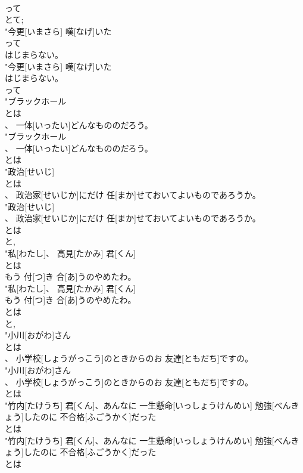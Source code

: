 \documentclass[8pt]{extreport}
\begin{document}
\begin{CJK}{UTF8}{min}
\\	って
\\	とて; 
\\	"今更[いまさら] 嘆[なげ]いた
\\	って
\\	はじまらない。
\\	"今更[いまさら] 嘆[なげ]いた
\\	はじまらない。
\\	って
\\	"ブラックホール
\\	とは
\\	、 一体[いったい]どんなもののだろう。
\\	"ブラックホール
\\	、 一体[いったい]どんなもののだろう。
\\	とは
\\	"政治[せいじ]
\\	とは
\\	、 政治家[せいじか]にだけ 任[まか]せておいてよいものであろうか。
\\	"政治[せいじ]
\\	、 政治家[せいじか]にだけ 任[まか]せておいてよいものであろうか。
\\	とは
\\	と, 
\\	"私[わたし]、 高見[たかみ] 君[くん]
\\	とは
\\	もう 付[つ]き 合[あ]うのやめたわ。
\\	"私[わたし]、 高見[たかみ] 君[くん]
\\	もう 付[つ]き 合[あ]うのやめたわ。
\\	とは
\\	と, 
\\	"小川[おがわ]さん
\\	とは
\\	、 小学校[しょうがっこう]のときからのお 友達[ともだち]ですの。
\\	"小川[おがわ]さん
\\	、 小学校[しょうがっこう]のときからのお 友達[ともだち]ですの。
\\	とは
\\	"竹内[たけうち] 君[くん]、あんなに 一生懸命[いっしょうけんめい] 勉強[べんきょう]したのに 不合格[ふごうかく]だった
\\	とは
\\	"竹内[たけうち] 君[くん]、あんなに 一生懸命[いっしょうけんめい] 勉強[べんきょう]したのに 不合格[ふごうかく]だった
\\	とは

\end{CJK}
\end{document}
